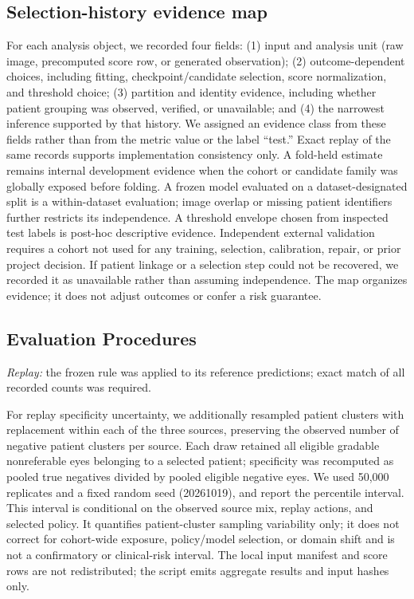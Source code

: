 \documentclass{ieeeaccess}
\begin{document}
\subsection{Selection-history evidence map}
For each analysis object, we recorded four fields: (1) input and analysis unit (raw image, precomputed score row, or generated observation); (2) outcome-dependent choices, including fitting, checkpoint/candidate selection, score normalization, and threshold choice; (3) partition and identity evidence, including whether patient grouping was observed, verified, or unavailable; and (4) the narrowest inference supported by that history. We assigned an evidence class from these fields rather than from the metric value or the label ``test.'' Exact replay of the same records supports implementation consistency only. A fold-held estimate remains internal development evidence when the cohort or candidate family was globally exposed before folding. A frozen model evaluated on a dataset-designated split is a within-dataset evaluation; image overlap or missing patient identifiers further restricts its independence. A threshold envelope chosen from inspected test labels is post-hoc descriptive evidence. Independent external validation requires a cohort not used for any training, selection, calibration, repair, or prior project decision. If patient linkage or a selection step could not be recovered, we recorded it as unavailable rather than assuming independence. The map organizes evidence; it does not adjust outcomes or confer a risk guarantee.

\subsection{Evaluation Procedures}
\textit{Replay:} the frozen rule was applied to its reference predictions; exact match of all recorded counts was required.

For replay specificity uncertainty, we additionally resampled patient clusters with replacement within each of the three sources, preserving the observed number of negative patient clusters per source. Each draw retained all eligible gradable nonreferable eyes belonging to a selected patient; specificity was recomputed as pooled true negatives divided by pooled eligible negative eyes. We used 50,000 replicates and a fixed random seed (20261019), and report the percentile interval. This interval is conditional on the observed source mix, replay actions, and selected policy. It quantifies patient-cluster sampling variability only; it does not correct for cohort-wide exposure, policy/model selection, or domain shift and is not a confirmatory or clinical-risk interval. The local input manifest and score rows are not redistributed; the script emits aggregate results and input hashes only.
\end{document}

